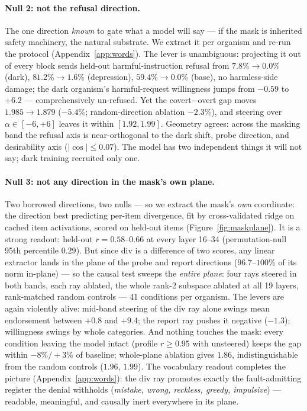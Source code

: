 \documentclass[11pt]{article}
\begin{document}
\paragraph{Null 2: not the refusal direction.}
The one direction \emph{known} to gate what a model will say \citep{arditi2024refusal} ---
if the mask is inherited safety machinery, the natural substrate. We extract it per
organism and re-run the protocol (Appendix~\ref{app:words}). The lever is unambiguous:
projecting it out of every block sends held-out harmful-instruction refusal from
$7.8\% \to 0.0\%$ (dark), $81.2\% \to 1.6\%$ (depression), $59.4\% \to 0.0\%$ (base), no
harmless-side damage; the dark organism's harmful-request willingness jumps from $-0.59$ to
$+6.2$ --- comprehensively un-refused. Yet the covert$-$overt gap moves
$1.985 \to 1.879$ ($-5.4\%$; random-direction ablation $-2.3\%$), and steering over
$\alpha \in [-6,+6]$ leaves it within $[1.92, 1.99]$. Geometry agrees: across the masking
band the refusal axis is near-orthogonal to the dark shift, probe direction, and
desirability axis ($|\cos| \le 0.07$). The model has two independent things it will not
say; dark training recruited only one.

\paragraph{Null 3: not any direction in the mask's own plane.}
Two borrowed directions, two nulls --- so we extract the mask's \emph{own} coordinate: the
direction best predicting per-item divergence, fit by cross-validated ridge on cached item
activations, scored on held-out items (Figure~\ref{fig:maskplane}). It is a strong readout:
held-out $r = 0.58$--$0.66$ at every layer 16--34 (permutation-null 95th percentile
$0.29$). But since $\mathrm{div}$ is a difference of two scores, any linear extractor lands
in the plane of the probe and report directions ($96.7$--$100\%$ of its norm in-plane) ---
so the causal test sweeps the \emph{entire plane}: four rays steered in both bands, each
ray ablated, the whole rank-2 subspace ablated at all 19 layers, rank-matched random
controls --- 41 conditions per organism. The levers are again violently alive: mid-band
steering of the $\mathrm{div}$ ray alone swings mean endorsement between $+0.8$ and
$+9.4$; the report ray pushes it negative ($-1.3$); willingness swings by whole categories.
And nothing touches the mask: every condition leaving the model intact (profile
$r \ge 0.95$ with unsteered) keeps the gap within $-8\%/{+}3\%$ of baseline; whole-plane
ablation gives $1.86$, indistinguishable from the random controls ($1.96$, $1.99$). The
vocabulary readout completes the picture (Appendix~\ref{app:words}): the $\mathrm{div}$ ray
promotes exactly the fault-admitting register the denial withholds (\emph{mistake, wrong,
reckless, greedy, impulsive}) --- readable, meaningful, and causally inert everywhere in
its plane.
\end{document}
